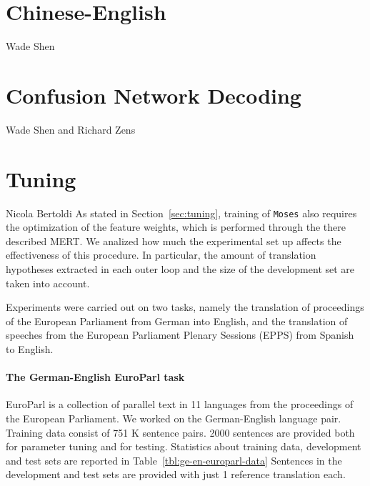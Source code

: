 \documentclass[10pt]{report}
\theoremstyle{plain}
\begin{document}
{{}  %


\section{Chinese-English}
{\sc Wade Shen}

\section{Confusion Network Decoding}
{\sc Wade Shen and Richard Zens}

\section{Tuning}
{\sc Nicola Bertoldi}
\label{sec:exp-tuning}
As stated in Section~\ref{sec:tuning}, training of {\tt Moses} also requires the optimization of the feature weights, which is performed through the there described MERT. We analized how much the experimental set up affects the effectiveness of this procedure. In particular, the amount of translation hypotheses extracted in each outer loop and the size of the development set are taken into account.

Experiments were carried out on two tasks, namely the translation of proceedings of 
the European Parliament from German into English, and the translation  of  speeches from the  European Parliament Plenary Sessions (EPPS) from Spanish to English.

\paragraph{The German-English EuroParl task}
\label{sec:ge-en-europarl-task}
EuroParl \cite{koehn:europarl:mtsummit:2005} is a collection of parallel text in 11 languages from the proceedings of the European Parliament. We worked on the German-English language pair. Training data consist of 751 K sentence pairs. 2000 sentences are provided both for parameter tuning and for testing.  Statistics about training data, development and test sets are reported in Table~\ref{tbl:ge-en-europarl-data}
Sentences in the development and test sets are provided with just 1 reference translation each.  

}
\end{document}
